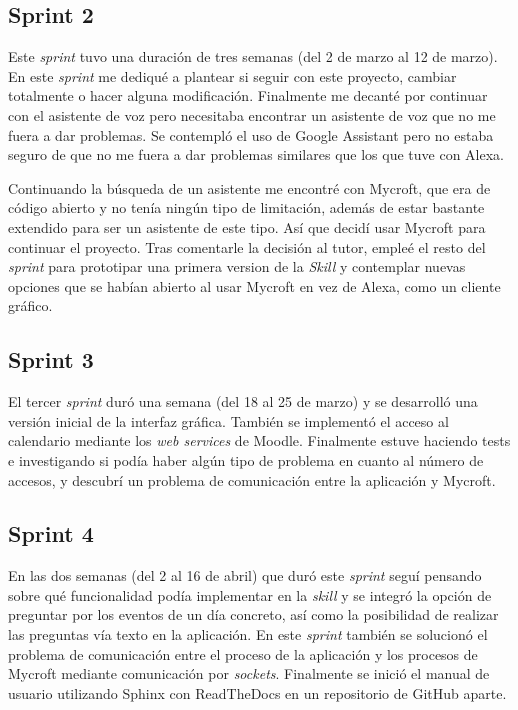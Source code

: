\subsection{Sprint 2}

Este \textit{sprint} tuvo una duración de tres semanas (del 2 de marzo al 12 de marzo). En este \textit{sprint} me dediqué a plantear si seguir con este proyecto, cambiar totalmente o hacer alguna modificación. Finalmente me decanté por continuar con el asistente de voz pero necesitaba encontrar un asistente de voz que no me fuera a dar problemas. Se contempló el uso de Google Assistant pero no estaba seguro de que no me fuera a dar problemas similares que los que tuve con Alexa.

Continuando la búsqueda de un asistente me encontré con Mycroft, que era de código abierto y no tenía ningún tipo de limitación, además de estar bastante extendido para ser un asistente de este tipo. Así que decidí usar Mycroft para continuar el proyecto.
Tras comentarle la decisión al tutor, empleé el resto del \textit{sprint} para prototipar una primera version de la \textit{Skill} y contemplar nuevas opciones que se habían abierto al usar Mycroft en vez de Alexa, como un cliente gráfico.

\subsection{Sprint 3}

El tercer \textit{sprint} duró una semana (del 18 al 25 de marzo) y se desarrolló una versión inicial de la interfaz gráfica. También se implementó el acceso al calendario mediante los \textit{web services} de Moodle. Finalmente estuve haciendo tests e investigando si podía haber algún tipo de problema en cuanto al número de accesos, y descubrí un problema de comunicación entre la aplicación y Mycroft.

\subsection{Sprint 4}

En las dos semanas (del 2 al 16 de abril) que duró este \textit{sprint} seguí pensando sobre qué funcionalidad podía implementar en la \textit{skill} y se integró la opción de preguntar por los eventos de un día concreto, así como la posibilidad de realizar las preguntas vía texto en la aplicación. En este \textit{sprint} también se solucionó el problema de comunicación entre el proceso de la aplicación y los procesos de Mycroft mediante comunicación por \textit{sockets}. Finalmente se inició el manual de usuario utilizando Sphinx con ReadTheDocs en un repositorio de GitHub aparte.

